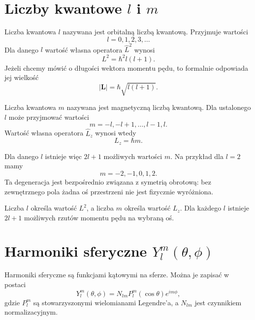 \section{Liczby kwantowe \texorpdfstring{\(l\)}{l} i \texorpdfstring{\(m\)}{m}}

Liczba kwantowa \(l\) nazywana jest orbitalną liczbą kwantową. Przyjmuje wartości
\begin{equation}
    l=0,1,2,3,\ldots
\end{equation}
Dla danego \(l\) wartość własna operatora \(\hat{L}^2\) wynosi
\begin{equation}
    L^2=\hbar^2 l(l+1).
\end{equation}
Jeżeli chcemy mówić o długości wektora momentu pędu, to formalnie odpowiada jej wielkość
\begin{equation}
    |\mathbf{L}|=\hbar\sqrt{l(l+1)}.
\end{equation}

Liczba kwantowa \(m\) nazywana jest magnetyczną liczbą kwantową. Dla ustalonego \(l\) może przyjmować wartości
\begin{equation}
    m=-l,-l+1,\ldots,l-1,l.
\end{equation}
Wartość własna operatora \(\hat{L}_z\) wynosi wtedy
\begin{equation}
    L_z=\hbar m.
\end{equation}

Dla danego \(l\) istnieje więc \(2l+1\) możliwych wartości \(m\). Na przykład dla \(l=2\) mamy
\[
    m=-2,-1,0,1,2.
\]
Ta degeneracja jest bezpośrednio związana z symetrią obrotową: bez zewnętrznego pola żadna oś przestrzeni nie jest fizycznie wyróżniona.

\begin{summarybox}
Liczba \(l\) określa wartość \(L^2\), a liczba \(m\) określa wartość \(L_z\). Dla każdego \(l\) istnieje \(2l+1\) możliwych rzutów momentu pędu na wybraną oś.
\end{summarybox}

\section{Harmoniki sferyczne \texorpdfstring{\(Y_l^m(\theta,\phi)\)}{Ylm(theta,phi)}}

Harmoniki sferyczne są funkcjami kątowymi na sferze. Można je zapisać w postaci
\begin{equation}
    Y_l^m(\theta,\phi)
    =N_{lm} P_l^m(\cos\theta)e^{im\phi},
\end{equation}
gdzie \(P_l^m\) są stowarzyszonymi wielomianami Legendre'a, a \(N_{lm}\) jest czynnikiem normalizacyjnym.

